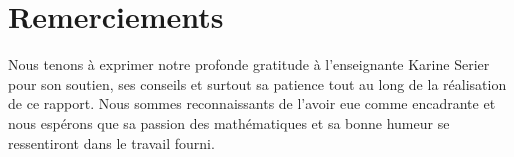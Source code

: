 \newpage

\section*{Remerciements}
Nous tenons à exprimer notre profonde gratitude à l’enseignante Karine Serier pour son soutien, ses conseils et surtout sa patience tout au long de la réalisation de ce rapport. Nous sommes reconnaissants de l’avoir eue comme encadrante et nous espérons que sa passion des mathématiques et sa bonne humeur se ressentiront dans le travail fourni.

